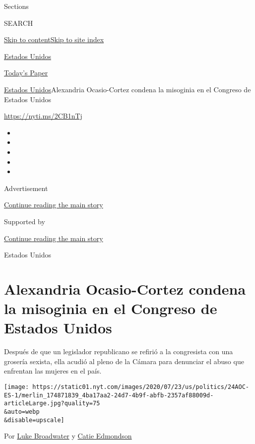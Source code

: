Sections

SEARCH

\protect\hyperlink{site-content}{Skip to
content}\protect\hyperlink{site-index}{Skip to site index}

\href{https://www.nytimes.com/es/section/estados-unidos}{Estados Unidos}

\href{https://myaccount.nytimes.com/auth/login?response_type=cookie\&client_id=vi}{}

\href{https://www.nytimes.com/section/todayspaper}{Today's Paper}

\href{/es/section/estados-unidos}{Estados Unidos}\textbar{}Alexandria
Ocasio-Cortez condena la misoginia en el Congreso de Estados Unidos

\url{https://nyti.ms/2CB1nTj}

\begin{itemize}
\item
\item
\item
\item
\item
\end{itemize}

Advertisement

\protect\hyperlink{after-top}{Continue reading the main story}

Supported by

\protect\hyperlink{after-sponsor}{Continue reading the main story}

Estados Unidos

\hypertarget{alexandria-ocasio-cortez-condena-la-misoginia-en-el-congreso-de-estados-unidos}{%
\section{Alexandria Ocasio-Cortez condena la misoginia en el Congreso de
Estados
Unidos}\label{alexandria-ocasio-cortez-condena-la-misoginia-en-el-congreso-de-estados-unidos}}

Después de que un legislador republicano se refirió a la congresista con
una grosería sexista, ella acudió al pleno de la Cámara para denunciar
el abuso que enfrentan las mujeres en el país.

\texttt{[image: https://static01.nyt.com/images/2020/07/23/us/politics/24AOC-ES-1/merlin\_174871839\_4ba17aa2-24d7-4b9f-abfb-2357af88009d-articleLarge.jpg?quality=75\\\&auto=webp\\\&disable=upscale]}

Por \href{https://www.nytimes.com/by/luke-broadwater}{Luke Broadwater} y
\href{https://www.nytimes.com/by/catie-edmondson}{Catie Edmondson}

